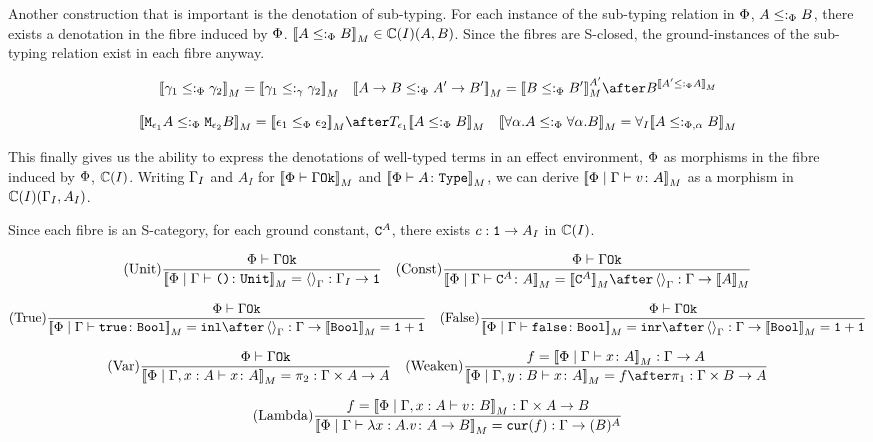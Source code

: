 \documentclass{Report}
\begin{document}
Another construction that is important is the denotation of sub-typing. For each instance of the sub-typing relation in $\P$, $A\subtypep B$, there exists a denotation in the fibre induced by $\P$. $\deno{A\subtypep B} \in\C(I)(A, B)$. Since the fibres are S-closed, the ground-instances of the sub-typing relation exist in each fibre anyway.


\[
    \deno{\g_1\subtypep \g_2} = \deno{\g_1\subtypeg \g_2}
    \quad
    \deno{\ab \subtypep \fntype{A'}{B'}} = \deno{B\subtypep B'}^{A'}\after B^{\deno{A'\subtypep A}}
\]

\[
    \deno{\M{\e_1}{A}\subtypep\M{\e_2}{B}} = \deno{\e_1\subeffectp\e_2}\after\T{\e_1}{\deno{A\subtypep B}}
    \quad    
    \deno{\all{\a}{A}\subtypep\all{\a}{B}} = \allI{\deno{A\subtypepa B}}
\]

This finally gives us the ability to express the denotations of well-typed terms in an effect environment, $\P$ as morphisms in the fibre induced by $\P$, $\C(I)$.  Writing $\G_I$ and $A_I$ for $\deno{\wellformedok{\P}{\G}}$ and $\deno{\typerelation{\P}{A}{\type}}$, we can derive $\deno{\gpetyperelation{v}{A}}$ as a morphism in $\C(I)(\G_I, A_I)$.

Since each fibre is an S-category, for each ground constant, $\const{A}$, there exists $c: \1 \rightarrow A_I$ in $\C(I)$.

\[
    \treerule{Unit}{\wellformedok{\P}{\G}}{\deno{\etyperelation{\P}{\G}{\u}{\U}} = \term{\G} : \G_I \rightarrow \1}
    \quad
    \treerule{Const}{\wellformedok{\P}{\G}}{\deno{\etyperelation{\P}{\G}{\const{A}}{A}} = \deno{\const{A}} \after \term{\G} : \G \rightarrow \deno{A}}
\]

\[
    \treerule{True}{\wellformedok{\P}{\G}}{\deno{\etyperelation{\P}{\G}{\t}{\B}} = \inl \after \term{\G} : \G \rightarrow \deno{\B} = \1+\1}
    \quad
    \treerule{False}{\wellformedok{\P}{\G}}{\deno{\etyperelation{\P}{\G}{\f}{\B}} = \inr \after \term{\G} : \G \rightarrow \deno{\B} = \1+\1}
\]

\[
    \treerule{Var}{\wellformedok{\P}{\G}}{\deno{\etyperelation{\P}{\gax}{x}{A}} = \pp: \G \times A \rightarrow A}
    \quad    
    \treerule{Weaken}{f = \deno{\gpetyperelation{x}{A}}: \G \rightarrow A}{\deno{\etyperelation{\P}{\gby}{x}{A}} = f \after \p: \G \times B \rightarrow A}
\]

\[
    \treerule{Lambda}{f = \deno{\etyperelation{\P}{\gax}{v}{B}} : \G \times A \rightarrow B}{\deno{\etyperelation{\P}{\G}{\lam{x}{A}{v}}{\ab}} = \cur{f} : \G \rightarrow (B)^A}
\]
\end{document}
